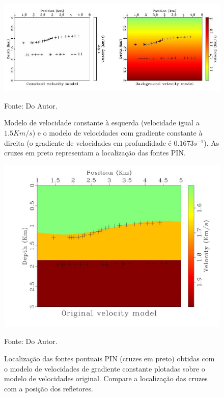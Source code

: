 \begin{figure}[H]
\caption{Modelo de velocidade constante à esquerda (velocidade igual a $1.5Km/s$)
e o modelo de velocidades com gradiente constante à direita
(o gradiente de velocidades em profundidade é $0.1673 s^{-1}$).
As cruzes em preto representam a localização das fontes PIN.}
\begin{center}
\includegraphics[scale=2]{images/compare.jpeg}
\vspace{-0.3cm}
\end{center}
\begin{center}
 Fonte: Do Autor.
\end{center}
\label{fig:10.3}
\end{figure}

\begin{figure}[H]
\caption{Localização das fontes pontuais PIN (cruzes em preto)
obtidas com o modelo de velocidades de gradiente
constante plotadas sobre o modelo de velocidades original.
Compare a localização das cruzes com a posição dos refletores.}
\begin{center}
\includegraphics[scale=0.3]{images/gzvel.jpeg}
\vspace{-0.3cm}
\end{center}
\begin{center}
 Fonte: Do Autor.
\end{center}
\label{fig:10.4}
\end{figure}


